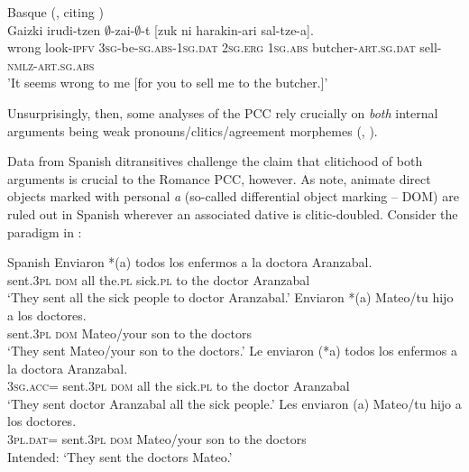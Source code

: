\documentclass[output=paper,colorlinks,citecolor=brown,nonflat]{langsci/langscibook}
\begin{document}
\ea%
    \label{ex:sheehan:10}
    Basque (\citealt[7]{Preminger2019}, citing \citealt[98]{Laka1996})\\
    \gll    Gaizki   irudi-tzen ${\emptyset}$-zai-${\emptyset}$-t         [zuk ni harakin-ari    sal-tze-a].\\
          wrong   look-\textsc{ipfv} \textsc{3sg}-be-\textsc{sg}.\textsc{abs}{}-\textsc{1sg}.\textsc{dat}  {\db}\textsc{2sg}.\textsc{erg}    \textsc{1sg}.\textsc{abs} butcher-\textsc{art.sg}.\textsc{dat} sell-\textsc{nmlz-art.sg.abs}\\
    \glt 'It seems wrong to me [for you to sell me to the butcher.]' %
\z

Unsurprisingly, then, some analyses of the PCC rely crucially on \textit{both} internal arguments being weak pronouns/clitics/agreement morphemes (\citealt{Bianchi2006}, \citealt{Stegovec2017}).

Data from Spanish ditransitives challenge the claim that clitichood of both arguments is crucial to the Romance PCC, however. As \citet{OrmazabalRomero2013Borealis} note, animate direct objects marked with personal \textit{a} (so-called differential object marking – DOM) are ruled out in Spanish wherever an associated dative is clitic-doubled. Consider the paradigm in :

\ea%
    \label{ex:sheehan:11}
    Spanish \citep[224]{OrmazabalRomero2013Borealis}
    \ea\label{ex:sheehan:11a}
    \gll   Enviaron   *(a)   todos los   enfermos a   la   doctora   Aranzabal.\\
        sent.\textsc{3pl}  \textsc{dom}   all   the.\textsc{pl}   sick.\textsc{pl}  to   the   doctor   Aranzabal\\
    \glt ‘They sent all the sick people to doctor Aranzabal.’
    \ex\label{ex:sheehan:11b}
    \gll   Enviaron  *(a)   Mateo/tu   hijo   a   los   doctores.\\
         sent.\textsc{3pl}  \textsc{dom}   Mateo/your   son   to   the   doctors\\
    \glt ‘They sent Mateo/your son to the doctors.’
    \ex\label{ex:sheehan:11c}
    \gll   Le   enviaron   (*a)  todos   los  enfermos   a  la  doctora   Aranzabal.\\
        \textsc{3sg.acc=} sent.\textsc{3pl}   \textsc{dom}   all   the sick.\textsc{pl}   to   the doctor Aranzabal\\
    \glt ‘They sent doctor Aranzabal all the sick people.’
    \ex\label{ex:sheehan:11d}
    \gll    *Les   enviaron   (a)   Mateo/tu   hijo  a   los   doctores.\\
        \textsc{3pl.dat}=  sent.\textsc{3pl}   \textsc{dom}   Mateo/your   son   to   the   doctors\\
    \glt Intended: ‘They sent the doctors Mateo.’
    \z
\z
\end{document}

